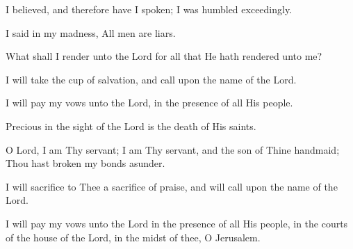 I believed, and therefore have I spoken; I was humbled exceedingly.

I said in my madness, All men are liars.

What shall I render unto the Lord for all that He hath rendered unto me?

I will take the cup of salvation, and call upon the name of the Lord.

I will pay my vows unto the Lord, in the presence of all His people.

Precious in the sight of the Lord is the death of His saints.

O Lord, I am Thy servant; I am Thy servant, and the son of Thine handmaid; Thou hast broken my bonds asunder.

I will sacrifice to Thee a sacrifice of praise, and will call upon the name of the Lord.

I will pay my vows unto the Lord in the presence of all His people, in the courts of the house of the Lord, in the midst of thee, O Jerusalem.
